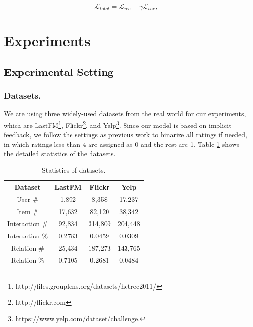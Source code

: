 \documentclass[letterpaper]{article} %
\begin{document}
\begin{align}
    \mathcal{L}_{total} = \mathcal{L}_{rec} + \gamma\mathcal{L}_{vae},
\end{align}

\section{Experiments}
\subsection{Experimental Setting}
\subsubsection{Datasets.}
We are using three widely-used datasets from the real world for our experiments, which are LastFM\footnote{http://files.grouplens.org/datasets/hetrec2011/}, Flickr\footnote{http://flickr.com}, and Yelp\footnote{https://www.yelp.com/dataset/challenge.}. Since our model is based on implicit feedback, we follow the settings as previous work \cite{MHCN} to binarize all ratings if needed, in which ratings less than 4 are assigned as 0 and the rest are 1. Table \ref{table_data} shows the detailed statistics of the datasets. 
\begin{table}[ht]
    \centering
    \begin{tabular}{c|ccc}
    \hline
    Dataset            & LastFM    & Flickr    & Yelp     \\ \hline\hline
    User \#            &1,892      &8,358      &17,237    \\
    Item \#            &17,632     &82,120     &38,342    \\
    Interaction \#     &92,834     &314,809    &204,448   \\  
    Interaction \%        &0.2783     &0.0459     &0.0309    \\
    Relation \#        &25,434     &187,273    &143,765   \\ 
    Relation \%          &0.7105     &0.2681     &0.0484    \\\hline
    \end{tabular}
    \caption{Statistics of datasets.}
    \label{table_data}
\end{table}
\end{document}
